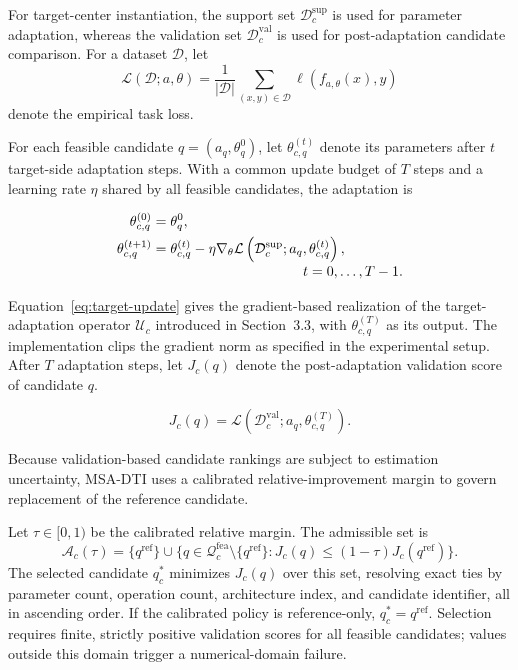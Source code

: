 \documentclass[a4paper,fleqn]{cas-sc}
\begin{document}
For target-center instantiation, the support set
$\mathcal{D}_c^{\mathrm{sup}}$ is used for parameter adaptation, whereas the
validation set $\mathcal{D}_c^{\mathrm{val}}$ is used for post-adaptation
candidate comparison. For a dataset $\mathcal{D}$, let
\begin{equation}
\mathcal{L}(\mathcal{D};a,\theta)
=
\frac{1}{|\mathcal{D}|}
\sum_{(x,y)\in\mathcal{D}}
\ell\!\left(f_{a,\theta}(x),y\right)
\label{eq:empirical-loss}
\end{equation}
denote the empirical task loss.

For each feasible candidate $q=(a_q,\theta_q^0)$, let
$\theta_{c,q}^{(t)}$ denote its parameters after $t$ target-side adaptation
steps. With a common update budget of $T$ steps and a learning rate $\eta$
shared by all feasible candidates, the adaptation is

\begin{equation}
\begin{aligned}
\theta_{c,q}^{(0)}
&=
\theta_q^{0},
\\
\theta_{c,q}^{(t+1)}
&=
\theta_{c,q}^{(t)}
-
\eta
\nabla_{\theta}
\mathcal{L}
\left(
\mathcal{D}_{c}^{\mathrm{sup}};
a_q,
\theta_{c,q}^{(t)}
\right),
\\[-1mm]
&\hspace{38mm}
t=0,\ldots,T-1.
\end{aligned}
\label{eq:target-update}
\end{equation}

Equation~\eqref{eq:target-update} gives the gradient-based realization of
the target-adaptation operator $\mathcal{U}_c$ introduced in Section~3.3,
with $\theta_{c,q}^{(T)}$ as its output. The implementation clips the
gradient norm as specified in the experimental setup. After $T$ adaptation steps, let
$J_c(q)$ denote the post-adaptation validation score of candidate $q$.

\begin{equation}
J_c(q)
=
\mathcal{L}
\left(
\mathcal{D}_{c}^{\mathrm{val}};
a_q,
\theta_{c,q}^{(T)}
\right).
\label{eq:validation-loss}
\end{equation}

Because validation-based candidate rankings are subject to estimation
uncertainty, MSA-DTI uses a calibrated relative-improvement margin to govern
replacement of the reference candidate.

Let $\tau\in[0,1)$ be the calibrated relative margin. The admissible set is
\begin{equation}
\mathcal A_c(\tau)=\{q^{\mathrm{ref}}\}\cup
\{q\in\mathcal Q_c^{\mathrm{fea}}\setminus\{q^{\mathrm{ref}}\}:
J_c(q)\leq(1-\tau)J_c(q^{\mathrm{ref}})\}.
\label{eq:reference-based-selection}
\end{equation}
The selected candidate $q_c^*$ minimizes $J_c(q)$ over this set, resolving
exact ties by parameter count, operation count, architecture index, and
candidate identifier, all in ascending order. If the calibrated policy is
reference-only, $q_c^*=q^{\mathrm{ref}}$. Selection requires finite, strictly
positive validation scores for all feasible candidates; values outside this
domain trigger a numerical-domain failure.
\end{document}
